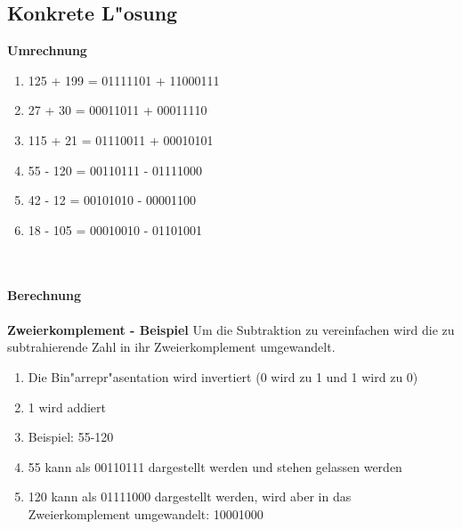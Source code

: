 \documentclass[a4paper,11pt,titlepage]{article}
\begin{document}
    \subsection{Konkrete L"osung}

    \noindent \textbf{Umrechnung}
    \begin{enumerate}
        \item 125 + 199 = 01111101 + 11000111
        \item 27 + 30 = 00011011 + 00011110
        \item 115 + 21 = 01110011 + 00010101
        \item 55 - 120 = 00110111 - 01111000
        \item 42 - 12 = 00101010 - 00001100
        \item 18 - 105 = 00010010 - 01101001
    \end{enumerate}
    \\ \\
    \noindent \textbf{Berechnung}
    \\ \\
    \noindent \textbf{Zweierkomplement - Beispiel}
    Um die Subtraktion zu vereinfachen wird die zu subtrahierende Zahl in ihr Zweierkomplement umgewandelt.
    \begin{enumerate}
        \item Die Bin"arrepr"asentation wird invertiert (0 wird zu 1 und 1 wird zu 0)
        \item 1 wird addiert
        \item Beispiel: 55-120
        \item 55 kann als 00110111 dargestellt werden und stehen gelassen werden
        \item 120 kann als 01111000 dargestellt werden, wird aber in das Zweierkomplement umgewandelt: 10001000
    \end{enumerate}
\end{document}
